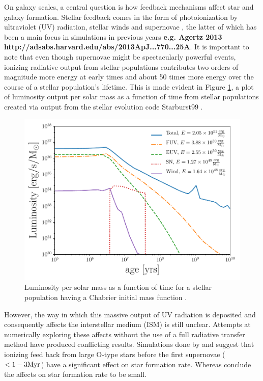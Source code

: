 \documentclass[fleq,usenatbib]{mnras}
\newcommand{\comment}[1]{\textbf{\color{red}#1}}
\begin{document}
On galaxy scales, a central question is how feedback mechanisms affect star and 
galaxy formation. Stellar 
feedback comes in the form of photoionization by ultraviolet (UV) radiation, 
stellar winds and supernovae \citep{leithererEt99}, the latter of which has 
been a main focus in simulations in previous years \comment{e.g. Agertz 2013 http://adsabs.harvard.edu/abs/2013ApJ...770...25A}. It is important to note that even 
though supernovae might be spectacularly powerful events, ionizing radiative 
output from stellar populations contributes two orders of 
magnitude more energy at early times and about 50 times more energy over the 
course of a stellar population's lifetime. This is made evident in Figure 
\ref{fig:uvsn}, a plot of luminosity output per solar mass as a function of 
time from stellar populations created via output from the stellar evolution 
code Starburst99 
\citep{leithererEt99}. 
\begin{figure}
\includegraphics[width=1\linewidth]{Figures/uvsn.pdf}
\caption{Luminosity per solar mass as a function of time for a stellar 
population having a Chabrier initial mass function \citep{chabrier03}.}
\label{fig:uvsn}
\end{figure}

However, the way in which this massive output of UV radiation is deposited 
and consequently affects the interstellar medium (ISM) is still unclear. 
Attempts at numerically exploring these affects without the use of a full 
radiative transfer method have produced conflicting results. Simulations done
by \cite{gritschnederEt09} and \citep{walchEt12} suggest that ionizing feed 
back from large O-type stars before the first supernovae ($<1-3\rm{Myr}$) have 
a significant effect on star formation rate. Whereas \cite{daleEt12} 
conclude the affects on star formation rate to be small.
\end{document}

